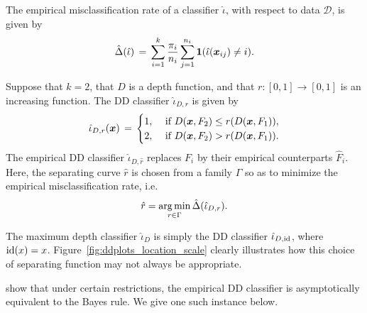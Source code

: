 \begin{definition}
    The empirical misclassification rate of a classifier $\hat{\iota}$, with
    respect to data $\mathscr{D}$, is given by
    \begin{equation}
        \hat{\Delta}(\hat{\iota}) \,=\, \sum_{i = 1}^k \frac{\pi_i}{n_i}\sum_{j = 1}^{n_i} \bm{1}(\hat{\iota}(\bm{x}_{ij}) \neq i).
    \end{equation}
\end{definition}


\begin{definition}[DD classifier]
    Suppose that $k = 2$, that $D$ is a depth function, and that $r\colon [0,
    1] \to [0, 1]$ is an increasing function. The DD classifier
    $\hat{\iota}_{D, r}$ is given by
    \begin{equation}
        \hat{\iota}_{D, r}(\bm{x}) \,=\, \begin{cases}
            1, &\text{ if } D(\bm{x}, F_2) \leq r(D(\bm{x}, F_1)), \\
            2, &\text{ if } D(\bm{x}, F_2) >    r(D(\bm{x}, F_1)).
        \end{cases}
    \end{equation}
    The empirical DD classifier $\hat{\iota}_{D, \hat{r}}$ replaces $F_i$ by
    their empirical counterparts $\hat{F}_i$.
    Here, the separating curve $\hat{r}$ is chosen from a family $\Gamma$ so
    as to minimize the empirical misclassification rate, i.e.
    \begin{equation}
        \hat{r} = \operatorname*{arg\,min}_{r \in \Gamma} \hat{\Delta}(\hat{\iota}_{D, r}).
    \end{equation}
\end{definition}
\begin{remark}
    The maximum depth classifier $\hat{\iota}_D$ is simply the DD classifier
    $\hat{\iota}_{D, \operatorname{id}}$, where $\operatorname{id}(x) = x$.
    Figure~\ref{fig:ddplots_location_scale} clearly illustrates how this
    choice of separating function may not always be appropriate.
\end{remark}

\textcite{li-albertos-liu-2012} show that under certain restrictions, the
empirical DD classifier is asymptotically equivalent to the Bayes rule. We
give one such instance below.

